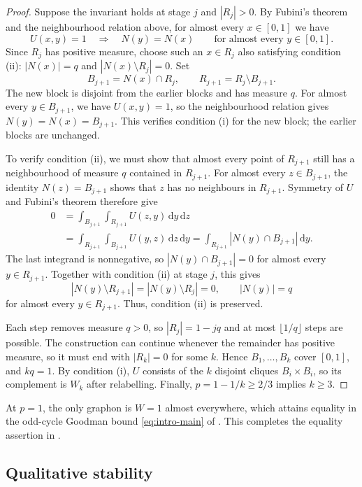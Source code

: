 \documentclass[11pt]{article}
\theoremstyle{remark}
\numberwithin{equation}{section}
\newcommand{\dd}{\,\mathrm d}
\begin{document}
\begin{proof}
  Suppose the invariant holds at stage $j$ and $|R_j|>0$.
  By Fubini's theorem and the neighbourhood relation above, for almost
  every $x\in[0,1]$ we have
  \[
    U(x,y)=1\quad\Longrightarrow\quad N(y)=N(x)
    \qquad\text{for almost every }y\in[0,1].
  \]
  Since $R_j$ has positive measure, choose such an $x\in R_j$ also
  satisfying condition (ii): $|N(x)|=q$ and
  $|N(x)\setminus R_j|=0$. Set
  \[
    B_{j+1}=N(x)\cap R_j,
    \qquad R_{j+1}=R_j\setminus B_{j+1}.
  \]
  The new block is disjoint from the earlier blocks and has measure
  $q$. For almost every $y\in B_{j+1}$, we have
  $U(x,y)=1$, so the neighbourhood relation gives
  $N(y)=N(x)=B_{j+1}$. This verifies condition (i) for the new block;
  the earlier blocks are unchanged.

  To verify condition (ii), we must show that almost every point of
  $R_{j+1}$ still has a neighbourhood of measure $q$ contained in
  $R_{j+1}$. For almost every $z\in B_{j+1}$, the identity
  $N(z)=B_{j+1}$ shows that $z$ has no neighbours in $R_{j+1}$.
  Symmetry of $U$ and Fubini's theorem therefore give
  \[
    \begin{aligned}
      0&=\int_{B_{j+1}}\int_{R_{j+1}}U(z,y)\dd y\dd z\\
       &=\int_{R_{j+1}}\int_{B_{j+1}}U(y,z)\dd z\dd y
        =\int_{R_{j+1}}|N(y)\cap B_{j+1}|\dd y.
    \end{aligned}
  \]
  The last integrand is nonnegative, so $|N(y)\cap B_{j+1}|=0$
  for almost every $y\in R_{j+1}$. Together with condition (ii) at
  stage $j$, this gives
  \[
    |N(y)\setminus R_{j+1}|=|N(y)\setminus R_j|=0,
    \qquad |N(y)|=q
  \]
  for almost every $y\in R_{j+1}$. Thus, condition (ii) is preserved.

  Each step removes measure $q>0$, so $|R_j|=1-jq$ and at most
  $\lfloor1/q\rfloor$ steps are possible. The construction can continue
  whenever the remainder has positive measure, so it must end with
  $|R_k|=0$ for some $k$. Hence $B_1,\ldots,B_k$ cover $[0,1]$,
  and $kq=1$. By condition (i), $U$ consists of the
  $k$ disjoint cliques $B_i\times B_i$, so its complement is $W_k$
  after relabelling.
  Finally, $p=1-1/k\ge2/3$ implies $k\ge3$.
\end{proof}

At $p=1$, the only graphon is $W=1$ almost everywhere, which attains equality
in the odd-cycle Goodman bound \eqref{eq:intro-main} of .
This completes the equality assertion in .

\subsection{Qualitative stability}
\label{subsec:qualitative-stability}
\end{document}
